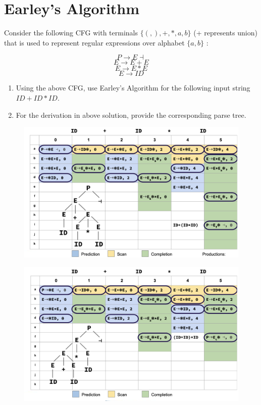 \documentclass[a4paper]{exam}
\begin{document}
\section{Earley's Algorithm}
Consider the following CFG with terminals $\{(,),+, *, a, b\}$ (+ represents union) that is
used to represent regular expressions over alphabet $\{a, b\}$ :

$$P \rightarrow E \dashv$$
$$E \rightarrow E+E$$
$$E \rightarrow E * E$$
$$E \rightarrow I D$$
\begin{enumerate}
  \item Using the above CFG, use Earley's Algorithm for the following input string $I D+I D * I D$.
  \item For the derivation in above solution, provide the corresponding parse tree.
\end{enumerate}
\begin{figure}[htbp]
    \centering
    \includegraphics[width=\columnwidth]{./img/first.png}
  \end{figure}
  
  \begin{figure}[htbp]
    \centering
    \includegraphics[width=\columnwidth]{./img/second.png}
  \end{figure}
\begin{solution}



\end{solution}
\end{document}
